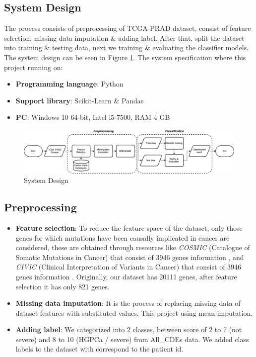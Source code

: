 \documentclass[a4paper,oneside]{article}
\begin{document}
\subsection{System Design}
The process consists of preprocessing of TCGA-PRAD dataset, consist of feature selection, missing data imputation \& adding label. After that, split the dataset into training \& testing data, next we training \& evaluating the classifier models. The system design can be seen in Figure \ref{fig:system_design}. The system specification where this project running on:
\begin{itemize}
\item \textbf{Programming language}: Python
\item \textbf{Support library}: Scikit-Learn \& Pandas
\item \textbf{PC}: Windows 10 64-bit, Intel i5-7500, RAM 4 GB
\end{itemize}

\begin{figure}
  \includegraphics[width=1\linewidth]{system_design}
  \centering
  \caption{System Design}
  \label{fig:system_design}
\end{figure}

\subsection{Preprocessing}
\begin{itemize}
\item \textbf{Feature selection}: To reduce the feature space of the dataset, only those genes for which mutations have been causally implicated in cancer are considered, these are obtained through resources like \textit{COSMIC} (Catalogue of Somatic Mutations in Cancer) that consist of 3946 genes information \cite{cosmicdata}, and \textit{CIVIC} (Clinical Interpretation of Variants in Cancer) that consist of 3946 genes information \cite{civicdata}. Originally, our dataset has 20111 genes, after feature selection it has only 821 genes.
\item \textbf{Missing data imputation}: It is the process of replacing missing data of dataset features with substituted values. This project using mean imputation.
\item \textbf{Adding label}: We categorized into 2 classes, between score of 2 to 7 (not severe) and 8 to 10 (HGPCa / severe)  from All\_CDEs data. We added class labels to the dataset with correspond to the patient id.

\end{itemize}
\end{document}
